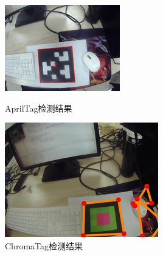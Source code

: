\begin{figure}[htb]
\begin{minipage}[t]{0.33\linewidth}
		\includegraphics[width=\columnwidth]{figures/4-1c.png} 
		\label{fig:4-1c} 
	\end{minipage}
	\caption{AprilTag检测结果}
	\label{fig:4-1}
\end{figure}

\begin{figure}[htb]
	\centering
	\includegraphics[width=0.4\linewidth]{figures/4-2.png}
	\caption{ChromaTag检测结果}
	\label{fig:4-2}
\end{figure}

